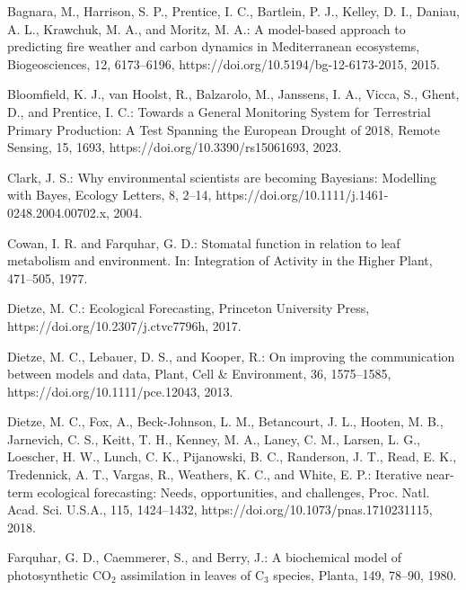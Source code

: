 \documentclass[gmd, manuscript]{copernicus}
\begin{document}
\begin{thebibliography}{}

Bagnara, M., Harrison, S. P., Prentice, I. C., Bartlein, P. J., Kelley, D. I., Daniau, A. L., Krawchuk, M. A., and Moritz, M. A.: A model-based approach to predicting fire weather and carbon dynamics in Mediterranean ecosystems, Biogeosciences, 12, 6173–6196, https://doi.org/10.5194/bg-12-6173-2015, 2015.

Bloomfield, K. J., van Hoolst, R., Balzarolo, M., Janssens, I. A., Vicca, S., Ghent, D., and Prentice, I. C.: Towards a General Monitoring System for Terrestrial Primary Production: A Test Spanning the European Drought of 2018, Remote Sensing, 15, 1693, https://doi.org/10.3390/rs15061693, 2023.

Clark, J. S.: Why environmental scientists are becoming Bayesians: Modelling with Bayes, Ecology Letters, 8, 2–14, https://doi.org/10.1111/j.1461-0248.2004.00702.x, 2004.

Cowan, I. R. and Farquhar, G. D.: Stomatal function in relation to leaf metabolism and environment. In: Integration of Activity in the Higher Plant, 471–505, 1977.

Dietze, M. C.: Ecological Forecasting, Princeton University Press, https://doi.org/10.2307/j.ctvc7796h, 2017.

Dietze, M. C., Lebauer, D. S., and Kooper, R.: On improving the communication between models and data, Plant, Cell \& Environment, 36, 1575–1585, https://doi.org/10.1111/pce.12043, 2013.

Dietze, M. C., Fox, A., Beck-Johnson, L. M., Betancourt, J. L., Hooten, M. B., Jarnevich, C. S., Keitt, T. H., Kenney, M. A., Laney, C. M., Larsen, L. G., Loescher, H. W., Lunch, C. K., Pijanowski, B. C., Randerson, J. T., Read, E. K., Tredennick, A. T., Vargas, R., Weathers, K. C., and White, E. P.: Iterative near-term ecological forecasting: Needs, opportunities, and challenges, Proc. Natl. Acad. Sci. U.S.A., 115, 1424–1432, https://doi.org/10.1073/pnas.1710231115, 2018.

Farquhar, G. D., Caemmerer, S., and Berry, J.: A biochemical model of photosynthetic CO$_2$ assimilation in leaves of C$_3$ species, Planta, 149, 78–90, 1980.


\end{thebibliography}
\end{document}
